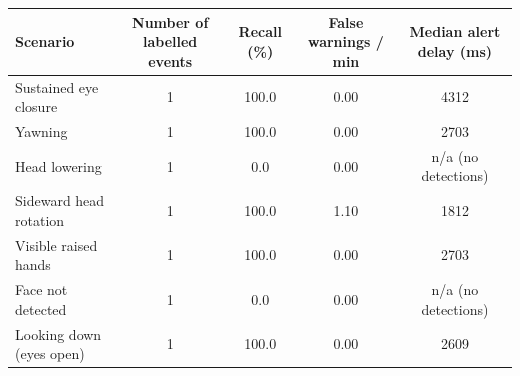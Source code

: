 \begin{tabular}{lcccc}
\hline
Scenario & Number of labelled events & Recall (\%) & False warnings / min & Median alert delay (ms) \\
\hline
Sustained eye closure & 1 & 100.0 & 0.00 & 4312 \\
Yawning & 1 & 100.0 & 0.00 & 2703 \\
Head lowering & 1 & 0.0 & 0.00 & n/a (no detections) \\
Sideward head rotation & 1 & 100.0 & 1.10 & 1812 \\
Visible raised hands & 1 & 100.0 & 0.00 & 2703 \\
Face not detected & 1 & 0.0 & 0.00 & n/a (no detections) \\
Looking down (eyes open) & 1 & 100.0 & 0.00 & 2609 \\
\hline
\end{tabular}
